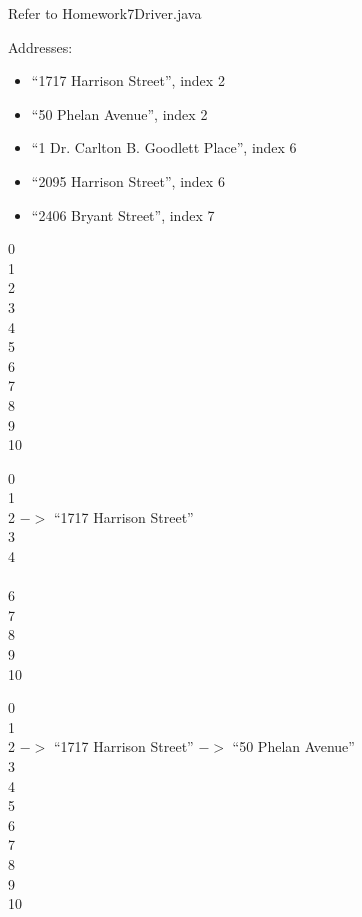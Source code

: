 \documentclass[10pt]{article}
\begin{document}
\begin{enumerate}
			\vspace{0.5cm}
			Refer to Homework7Driver.java
			
			\vspace{0.5cm}
			Addresses:
			\begin{itemize}
				\item ``1717 Harrison Street'', index 2
				\item ``50 Phelan Avenue'', index 2
				\item ``1 Dr. Carlton B. Goodlett Place'', index 6
				\item ``2095 Harrison Street'', index 6
				\item ``2406 Bryant Street'', index 7
			\end{itemize}
			
			\vspace{0.5cm}
			0\\
			1\\
			2\\
			3\\
			4\\
			5\\
			6\\
			7\\
			8\\
			9\\
			10
			
			\vspace{0.5cm}
			0\\
			1\\
			2 $->$ ``1717 Harrison Street''\\
			3\\
			4\\ \\  
			6\\  
			7\\  
			8\\  
			9\\  
			10  
			
			\vspace{0.5cm}
			0\\  
			1\\  
			2 $->$ ``1717 Harrison Street'' $->$ ``50 Phelan Avenue''\\  
			3\\  
			4\\  
			5\\  
			6\\  
			7\\  
			8\\  
			9\\  
			10
			

\end{enumerate}
\end{document}

